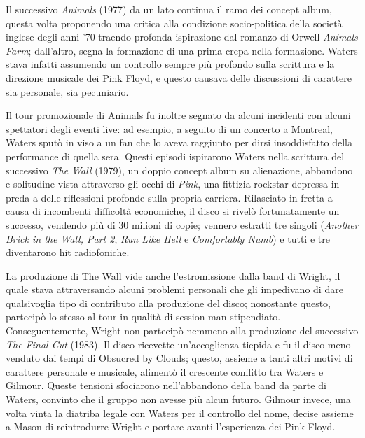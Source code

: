 \documentclass[class=book, crop=false, oneside, 12pt]{standalone}
\begin{document}
    Il successivo \emph{Animals} (1977) da un lato continua il ramo dei concept album, questa volta proponendo una critica alla condizione socio-politica della società inglese degli anni '70 traendo profonda ispirazione dal romanzo di Orwell \emph{Animals Farm}; dall'altro, segna la formazione di una prima crepa nella formazione. Waters stava infatti assumendo un controllo sempre più profondo sulla scrittura e la direzione musicale dei Pink Floyd, e questo causava delle discussioni di carattere sia personale, sia pecuniario. 
    
    Il tour promozionale di Animals fu inoltre segnato da alcuni incidenti con alcuni spettatori degli eventi live: ad esempio, a seguito di un concerto a Montreal, Waters sputò in viso a un fan che lo aveva raggiunto per dirsi insoddisfatto della performance di quella sera. Questi episodi ispirarono Waters nella scrittura del successivo \emph{The Wall} (1979), un doppio concept album su alienazione, abbandono e solitudine vista attraverso gli occhi di \emph{Pink}, una fittizia rockstar depressa in preda a delle riflessioni profonde sulla propria carriera. Rilasciato in fretta a causa di incombenti difficoltà economiche, il disco si rivelò fortunatamente un successo, vendendo più di 30 milioni di copie; vennero estratti tre singoli (\emph{Another Brick in the Wall, Part 2}, \emph{Run Like Hell} e \emph{Comfortably Numb}) e tutti e tre diventarono hit radiofoniche. 
    
    La produzione di The Wall vide anche l'estromissione dalla band di Wright, il quale stava attraversando alcuni problemi personali che gli impedivano di dare qualsivoglia tipo di contributo alla produzione del disco; nonostante questo, partecipò lo stesso al tour in qualità di session man stipendiato. Conseguentemente, Wright non partecipò nemmeno alla produzione del successivo \emph{The Final Cut} (1983). Il disco ricevette un'accoglienza tiepida e fu il disco meno venduto dai tempi di Obsucred by Clouds; questo, assieme a tanti altri motivi di carattere personale e musicale, alimentò il crescente conflitto tra Waters e Gilmour. Queste tensioni sfociarono nell'abbandono della band da parte di Waters, convinto che il gruppo non avesse più alcun futuro. Gilmour invece, una volta vinta la diatriba legale con Waters per il controllo del nome, decise assieme a Mason di reintrodurre Wright e portare avanti l'esperienza dei Pink Floyd.
\end{document}
